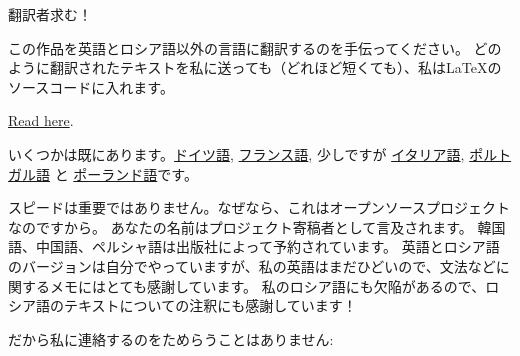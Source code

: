 \vspace*{\fill}

\Huge 翻訳者求む！

\normalsize

\bigskip
\bigskip
\bigskip

この作品を英語とロシア語以外の言語に翻訳するのを手伝ってください。
どのように翻訳されたテキストを私に送っても（どれほど短くても）、私はLaTeXのソースコードに入れます。

\href{https://github.com/DennisYurichev/RE-for-beginners/blob/master/Translation.md}{Read here}.

いくつかは既にあります。\href{https://beginners.re/RE4B-DE.pdf}{ドイツ語},
\href{https://beginners.re/RE4B-FR.pdf}{フランス語}, 少しですが
\href{https://yurichev.com/tmp/RE4B-IT-partial.pdf}{イタリア語},
\href{https://yurichev.com/tmp/RE4B-PTBR-lite2.pdf}{ポルトガル語} と
\href{https://yurichev.com/tmp/RE4B-PL.pdf}{ポーランド語}です。

スピードは重要ではありません。なぜなら、これはオープンソースプロジェクトなのですから。
あなたの名前はプロジェクト寄稿者として言及されます。
韓国語、中国語、ペルシャ語は出版社によって予約されています。
英語とロシア語のバージョンは自分でやっていますが、私の英語はまだひどいので、文法などに関するメモにはとても感謝しています。
私のロシア語にも欠陥があるので、ロシア語のテキストについての注釈にも感謝しています！

だから私に連絡するのをためらうことはありません: \GTT{\EMAIL}

\vspace*{\fill}
\vfill
